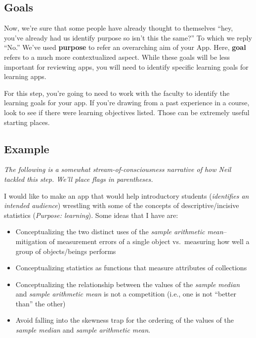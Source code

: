 \documentclass[
]{book}
\providecommand{\tightlist}{%
  \setlength{\itemsep}{0pt}\setlength{\parskip}{0pt}}
\begin{document}
\hypertarget{step2c}{%
\subsection{Goals}\label{step2c}}

Now, we're sure that some people have already thought to themselves ``hey, you've already had us identify purpose so isn't this the same?'' To which we reply ``No.'' We've used \textbf{purpose} to refer an overarching aim of your App. Here, \textbf{goal} refers to a much more contextualized aspect. While these goals will be less important for reviewing apps, you will need to identify specific learning goals for learning apps.

For this step, you're going to need to work with the faculty to identify the learning goals for your app. If you're drawing from a past experience in a course, look to see if there were learning objectives listed. Those can be extremely useful starting places.

\hypertarget{example}{%
\subsection{Example}\label{example}}

\emph{The following is a somewhat stream-of-consciousness narrative of how Neil tackled this step. We'll place flags in parentheses.}

I would like to make an app that would help introductory students (\emph{identifies an intended audience}) wrestling with some of the concepts of descriptive/incisive statistics (\emph{Purpose: learning}). Some ideas that I have are:

\begin{itemize}
\tightlist
\item
  Conceptualizing the two distinct uses of the \emph{sample arithmetic mean}--mitigation of measurement errors of a single object vs.~measuring how well a group of objects/beings performs
\item
  Conceptualizing statistics as functions that measure attributes of collections
\item
  Conceptualizing the relationship between the values of the \emph{sample median} and \emph{sample arithmetic mean} is not a competition (i.e., one is not ``better than'' the other)
\item
  Avoid falling into the skewness trap for the ordering of the values of the \emph{sample median} and \emph{sample arithmetic mean}.
\end{itemize}
\end{document}
